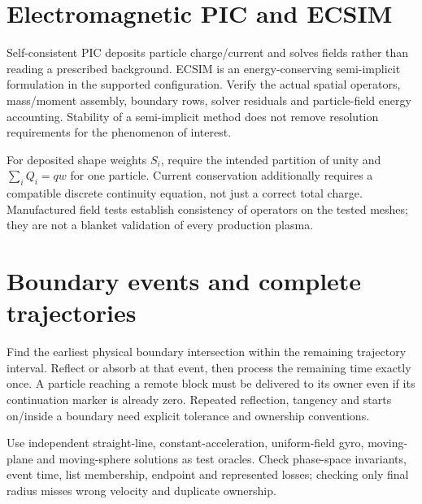 \section{Electromagnetic PIC and ECSIM}
Self-consistent PIC deposits particle charge/current and solves fields rather
than reading a prescribed background. ECSIM is an energy-conserving
semi-implicit formulation in the supported configuration. Verify the actual
spatial operators, mass/moment assembly, boundary rows, solver residuals and
particle-field energy accounting. Stability of a semi-implicit method does
not remove resolution requirements for the phenomenon of interest.

For deposited shape weights $S_i$, require the intended partition of unity
and $\sum_i Q_i=q w$ for one particle. Current conservation additionally
requires a compatible discrete continuity equation, not just a correct total
charge. Manufactured field tests establish consistency of operators on the
tested meshes; they are not a blanket validation of every production plasma.

\section{Boundary events and complete trajectories}
Find the earliest physical boundary intersection within the remaining
trajectory interval. Reflect or absorb at that event, then process the
remaining time exactly once. A particle reaching a remote block must be
delivered to its owner even if its continuation marker is already zero.
Repeated reflection, tangency and starts on/inside a boundary need explicit
tolerance and ownership conventions.

Use independent straight-line, constant-acceleration, uniform-field gyro,
moving-plane and moving-sphere solutions as test oracles. Check phase-space
invariants, event time, list membership, endpoint and represented losses;
checking only final radius misses wrong velocity and duplicate ownership.
